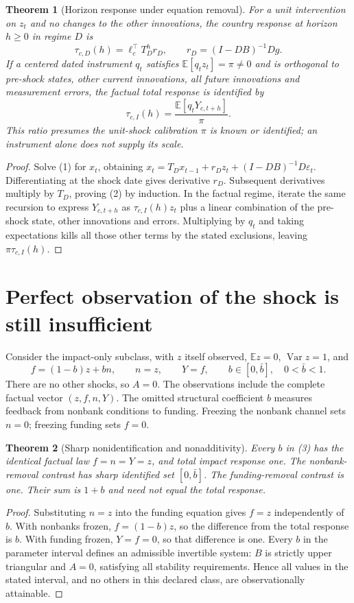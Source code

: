 \documentclass[11pt,a4paper]{article}
\newtheorem{theorem}{Theorem}[section]
\theoremstyle{definition}
\theoremstyle{remark}
\newcommand{\E}{\mathbb{E}}
\DeclareMathOperator{\Var}{Var}
\begin{document}
\begin{theorem}[Horizon response under equation removal]
For a unit intervention on $z_t$ and no changes to the other innovations, the country response at horizon $h\geq0$ in regime $D$ is
\[
 \tau_{c,D}(h)=\ell_c^\top T_D^h r_D,\qquad
 r_D=(I-DB)^{-1}Dg.\tag{2}
\]
If a centered dated instrument $q_t$ satisfies $\E[q_tz_t]=\pi\ne0$ and is orthogonal to pre-shock states, other current innovations, all future innovations and measurement errors, the factual total response is identified by
\[
 \tau_{c,I}(h)=\frac{\E[q_tY_{c,t+h}]}{\pi}.
\]
This ratio presumes the unit-shock calibration $\pi$ is known or identified; an instrument alone does not supply its scale.
\end{theorem}
\begin{proof}
Solve (1) for $x_t$, obtaining $x_t=T_Dx_{t-1}+r_Dz_t+(I-DB)^{-1}D\varepsilon_t$. Differentiating at the shock date gives derivative $r_D$. Subsequent derivatives multiply by $T_D$, proving (2) by induction. In the factual regime, iterate the same recursion to express $Y_{c,t+h}$ as $\tau_{c,I}(h)z_t$ plus a linear combination of the pre-shock state, other innovations and errors. Multiplying by $q_t$ and taking expectations kills all those other terms by the stated exclusions, leaving $\pi\tau_{c,I}(h)$.
\end{proof}

\section{Perfect observation of the shock is still insufficient}
Consider the impact-only subclass, with $z$ itself observed, $\E z=0$, $\Var z=1$, and
\[
 f=(1-b)z+b n,\qquad n=z,\qquad Y=f,
 \qquad b\in[0,\bar b],\quad0<\bar b<1.\tag{3}
\]
There are no other shocks, so $A=0$. The observations include the complete factual vector $(z,f,n,Y)$. The omitted structural coefficient $b$ measures feedback from nonbank conditions to funding. Freezing the nonbank channel sets $n=0$; freezing funding sets $f=0$.

\begin{theorem}[Sharp nonidentification and nonadditivity]
Every $b$ in (3) has the identical factual law $f=n=Y=z$, and total impact response one. The nonbank-removal contrast has sharp identified set $[0,\bar b]$. The funding-removal contrast is one. Their sum is $1+b$ and need not equal the total response.
\end{theorem}
\begin{proof}
Substituting $n=z$ into the funding equation gives $f=z$ independently of $b$. With nonbanks frozen, $f=(1-b)z$, so the difference from the total response is $b$. With funding frozen, $Y=f=0$, so that difference is one. Every $b$ in the parameter interval defines an admissible invertible system: $B$ is strictly upper triangular and $A=0$, satisfying all stability requirements. Hence all values in the stated interval, and no others in this declared class, are observationally attainable.
\end{proof}
\end{document}
